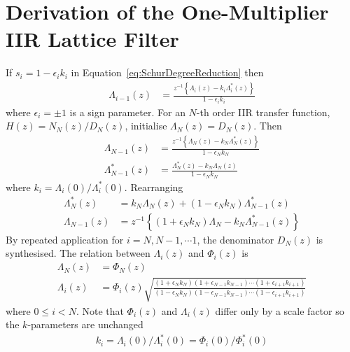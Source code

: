 \documentclass[a4paper,twoside,10pt,english]{report}
\begin{document}
\section{Derivation of the One-Multiplier IIR Lattice Filter}
If $s_{i}=1-\epsilon_{i}k_{i}$ in Equation~\ref{eq:SchurDegreeReduction}
then 
\begin{align*}
\Lambda_{i-1}\left(z\right) & = \frac{z^{-1}\left\{ \Lambda_{i}\left(z\right)-k_{i}\Lambda_{i}^{*}\left(z\right)\right\} }{1-\epsilon_{i}k_{i}}
\end{align*}
where $\epsilon_{i}=\pm1$ is a sign parameter. For an $N$-th order
IIR transfer function, $H\left(z\right)=N_{N}\left(z\right)/D_{N}\left(z\right)$,
initialise $\Lambda_{N}\left(z\right)=D_{N}\left(z\right)$. Then
\begin{align*}
\Lambda_{N-1}\left(z\right) & = \frac{z^{-1}\left\{ \Lambda_{N}\left(z\right)-k_{N}\Lambda_{N}^{*}\left(z\right)\right\} }{1-\epsilon_{N}k_{N}}\\
\Lambda_{N-1}^{*}\left(z\right) & = \frac{\Lambda_{N}^{*}\left(z\right)-k_{N}\Lambda_{N}\left(z\right)}{1-\epsilon_{N}k_{N}}
\end{align*}
where $k_{i}=\Lambda_{i}\left(0\right)/\Lambda_{i}^{*}\left(0\right)$.
Rearranging
\begin{align}
\Lambda_{N}^{*}\left(z\right) & = k_{N}\Lambda_{N}\left(z\right)+\left(1-\epsilon_{N}k_{N}\right)\Lambda_{N-1}^{*}\left(z\right)\label{eq:OneMultSynthesisStar}\\
\Lambda_{N-1}\left(z\right) & = z^{-1}\left\{ \left(1+\epsilon_{N}k_{N}\right)\Lambda_{N}-k_{N}\Lambda_{N-1}^{*}\left(z\right)\right\} \label{eq:OneMultSynthesis}
\end{align}
By repeated application for $i=N,N-1,\cdots1$, the denominator $D_{N}\left(z\right)$
is synthesised. The relation between $\Lambda_{i}\left(z\right)$
and $\Phi_{i}\left(z\right)$ is
\begin{align*}
\Lambda_{N}\left(z\right) & = \Phi_{N}\left(z\right)\\
\Lambda_{i}\left(z\right) & = \Phi_{i}\left(z\right)\sqrt{\frac{\left(1+\epsilon_{N}k_{N}\right)\left(1+\epsilon_{N-1}k_{N-1}\right)\cdots\left(1+\epsilon_{i+1}k_{i+1}\right)}{\left(1-\epsilon_{N}k_{N}\right)\left(1-\epsilon_{N-1}k_{N-1}\right)\cdots\left(1-\epsilon_{i+1}k_{i+1}\right)}}
\end{align*}
where $0\leq i<N$. Note that $\Phi_{i}\left(z\right)$ and $\Lambda_{i}\left(z\right)$
differ only by a scale factor so the $k$-parameters are unchanged
\begin{align*}
k_{i}=\Lambda_{i}\left(0\right)/\Lambda_{i}^{*}\left(0\right)=\Phi_{i}\left(0\right)/\Phi_{i}^{*}\left(0\right)
\end{align*}
\end{document}
